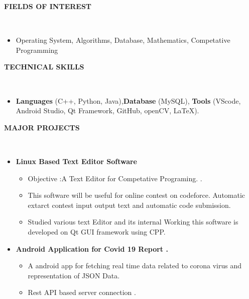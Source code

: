\documentclass[a4paper,11pt]{article}
\newcommand{\isep}{-2 pt}
\newcommand{\lsep}{-0.5cm}
\newcommand{\resheading}[1]{{\small \colorbox{mygrey}{\begin{minipage}{0.975\textwidth}{\textbf{#1 \vphantom{p\^{E}}}}\end{minipage}}}}
\begin{document}
\resheading{\textbf{FIELDS OF INTEREST} }\\[\lsep]
\begin{itemize}
\item \noindent Operating System, Algorithms, Database, Mathematics, Competative Programming
\end{itemize}

\resheading{\textbf{TECHNICAL SKILLS} }\\[\lsep]
\begin{itemize}
\item \noindent \textbf{Languages} (C++, Python, Java),\textbf{Database} (MySQL), \textbf{Tools} (VScode, Android Studio, Qt Framework, GitHub, openCV, \LaTeX).
\end{itemize}

\resheading{\textbf{MAJOR PROJECTS} }\\[\lsep]
\begin{itemize}
\item \textbf{Linux Based Text Editor Software 
}   \\[-0.6cm]
	\begin{itemize}\itemsep \isep
	\item Objective :A Text Editor for Competative Programing.
.
	\item This software will be useful for online contest on codeforce. Automatic extarct contest input output text and automatic code submission.

	\item Studied various text Editor and its internal Working this software is developed on Qt GUI framework using CPP.

	\end{itemize}

\item \textbf{Android Application for Covid 19 Report .
}  
	\begin{itemize}\itemsep \isep
	\item A android app for fetching real time data related to corona virus and representation of JSON Data.
	\item Rest API based server connection .
	\end{itemize}
\end{itemize}
\end{document}
